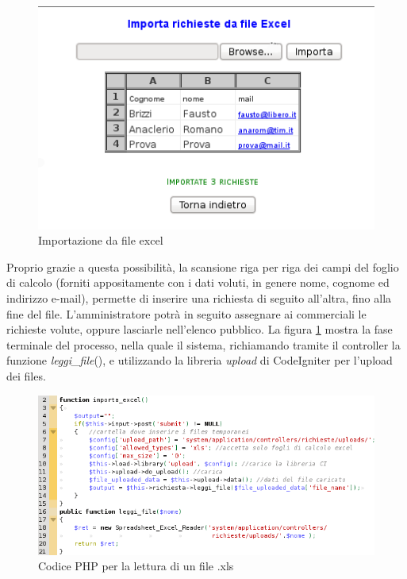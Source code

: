 \begin{figure}[!ht]
\centering
  \includegraphics[scale=0.8]{./images/importaExcelScreen.png}
\caption{Importazione da file excel}
\label{excel}
\end{figure}

\noindent
Proprio grazie a questa possibilit\`a, la scansione riga per riga dei campi del foglio di calcolo (forniti appositamente con i dati voluti, in genere nome, cognome ed indirizzo e-mail), permette di inserire una richiesta di seguito all'altra, fino alla fine del file. L'amministratore potr\`a in seguito assegnare ai commerciali le richieste volute, oppure lasciarle nell'elenco pubblico. 
\newpage
La figura \ref{excel} mostra la fase terminale del processo, nella quale il sistema, richiamando tramite il controller la funzione \textit{leggi\_file}(), e utilizzando la libreria \textit{upload} di CodeIgniter per l'upload dei files.

\begin{figure}[!ht]
\centering
  \includegraphics[scale=0.8]{./images/codiceexcel.png}
\caption{Codice PHP per la lettura di un file .xls}
\label{excelcode}
\end{figure}

